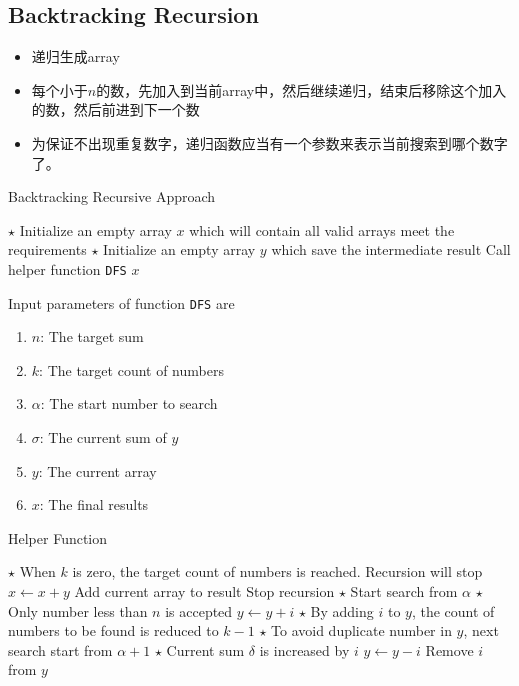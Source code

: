 \subsection{Backtracking Recursion}
\begin{CJK*}{UTF8}{gbsn}
\begin{itemize}
\item 递归生成array
\item 每个小于$n$的数，先加入到当前array中，然后继续递归，结束后移除这个加入的数，然后前进到下一个数
\item 为保证不出现重复数字，递归函数应当有一个参数来表示当前搜索到哪个数字了。
\end{itemize}
\end{CJK*}
\setcounter{algorithm}{0}
\begin{algorithm}[H]
\caption{Backtracking Recursive Approach}
\begin{algorithmic}[1]
\State $\star$ Initialize an empty array $x$ which will contain all valid arrays meet the requirements
\State $\star$ Initialize an empty array $y$ which save the intermediate result
\State {} \Comment Call helper function \texttt{DFS}
\State \Return $x$
\end{algorithmic}
\end{algorithm}
\begin{algorithm}[H]
\begin{algorithmic}[1]
\EndProcedure
\end{algorithmic}
\end{algorithm}
Input parameters of function \texttt{DFS} are
\begin{enumerate}
\item $n$: The target sum
\item $k$: The target count of numbers
\item $\alpha$: The start number to search
\item $\sigma$: The current sum of $y$
\item $y$: The current array
\item $x$: The final results
\end{enumerate}
\begin{algorithm}[H]
\caption{Helper Function}
\begin{algorithmic}[1]
\State $\star$ When $k$ is zero, the target count of numbers is reached. Recursion will stop
\State $x\gets x+y$ \Comment Add current array to result
\EndIf
\State \Return \Comment Stop recursion
\EndIf
\State $\star$ Start search from $\alpha$
\State $\star$ Only number less than $n$ is accepted
\State $y\gets y+i$ 
\State $\star$ By adding $i$ to $y$, the count of numbers to be found is reduced to $k-1$
\State $\star$ To avoid duplicate number in $y$, next search start from $\alpha+1$
\State $\star$ Current sum $\delta$ is increased by $i$
\State {}
\State $y\gets y-i$ \Comment Remove $i$ from $y$ 
\EndIf
\EndFor
\EndProcedure
\end{algorithmic}
\end{algorithm}
